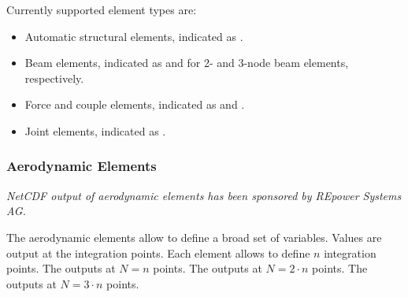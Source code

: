 Currently supported element types are:
\begin{itemize}
\item Automatic structural elements, indicated as .
\item Beam elements, indicated as  and 
for 2- and 3-node beam elements, respectively.
\item Force and couple elements, indicated as  and .
\item Joint elements, indicated as .
\end{itemize}


\subsubsection{Aerodynamic Elements}
\label{sec:NetCDF:Elem:Aerodynamic}
\emph{NetCDF output of aerodynamic elements has been sponsored
by REpower Systems AG.}

The aerodynamic elements allow to define a broad set of variables.
Values are output at the integration points.
Each element allows to define $n$ integration points.
The  outputs at $N = n$ points.
The  outputs at $N = 2 \cdot n$ points.
The  outputs at $N = 3 \cdot n$ points.


